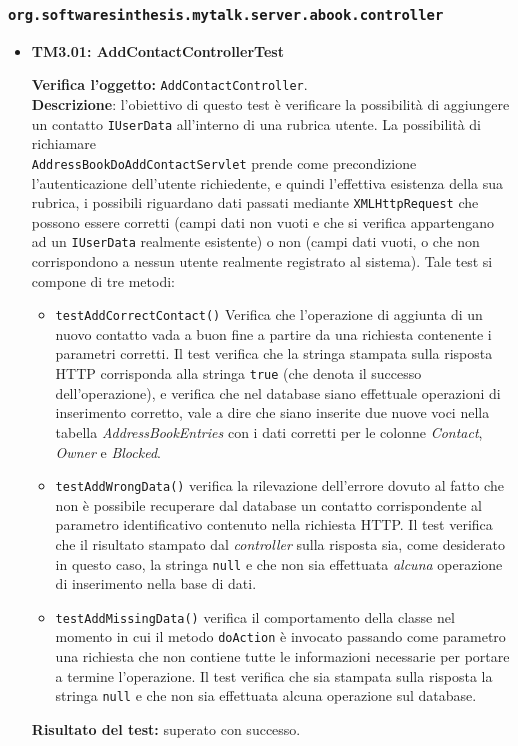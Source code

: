 \subsubsection{\texttt{org.softwaresinthesis.mytalk.server.abook.controller}}
\begin{itemize}

\item \textbf{TM3.01: AddContactControllerTest}

\textbf{Verifica l'oggetto:} \texttt{AddContactController}.\\
\textbf{Descrizione}: l'obiettivo di questo test è verificare la possibilità di aggiungere un contatto \texttt{IUserData} all'interno di una rubrica utente.
La possibilità di richiamare \\ \texttt{AddressBookDoAddContactServlet} prende come precondizione l'autenticazione dell'utente richiedente, e quindi l'effettiva esistenza della sua rubrica, i possibili  riguardano dati passati mediante \texttt{XMLHttpRequest} che possono essere corretti (campi dati non vuoti e che si verifica appartengano ad un \texttt{IUserData} realmente esistente) o non (campi dati vuoti, o che non corrispondono a nessun utente realmente registrato al sistema). %
Tale test si compone di tre metodi:
\begin{itemize}
\item \texttt{testAddCorrectContact()} Verifica che l'operazione di aggiunta di un nuovo contatto vada a buon fine a partire da una richiesta contenente i parametri corretti. Il test verifica che la stringa stampata sulla risposta HTTP corrisponda alla stringa \texttt{true} (che denota il successo dell'operazione), e verifica che nel database siano effettuale operazioni di inserimento corretto, vale a dire che siano inserite due nuove voci nella tabella \textit{AddressBookEntries} con i dati corretti per le colonne \textit{Contact}, \textit{Owner} e \textit{Blocked}.

\item \texttt{testAddWrongData()} verifica la rilevazione dell'errore dovuto al fatto che non è possibile recuperare dal database un contatto corrispondente al parametro identificativo contenuto nella richiesta HTTP. Il test verifica che il risultato stampato dal \textit{controller} sulla risposta sia, come desiderato in questo caso, la stringa \texttt{null} e che non sia effettuata \textit{alcuna} operazione di inserimento nella base di dati.

\item \texttt{testAddMissingData()} verifica il comportamento della classe nel momento in cui il metodo \texttt{doAction} è invocato passando come parametro una richiesta che non contiene tutte le informazioni necessarie per portare a termine l'operazione. Il test verifica che sia stampata sulla risposta la stringa \texttt{null} e che non sia effettuata alcuna operazione sul database.
\end{itemize}
\textbf{Risultato del test:} superato con successo.



\end{itemize}
